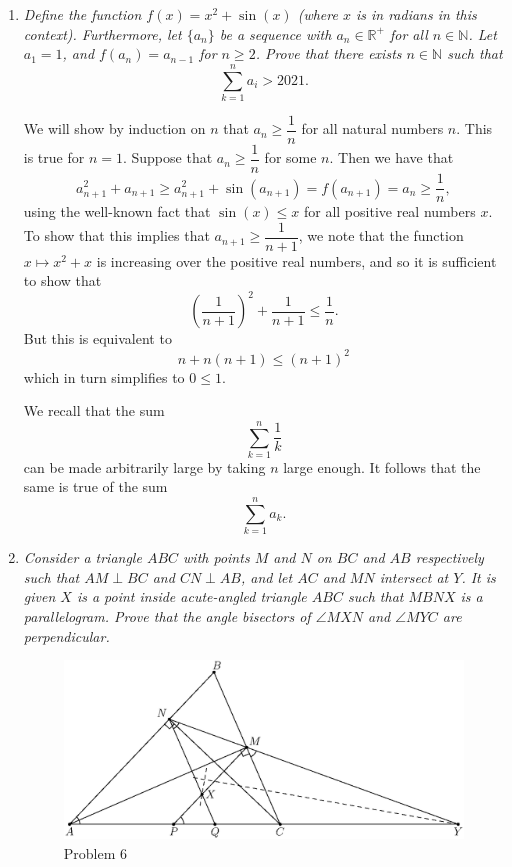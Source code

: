 \documentclass{article}
\begin{document}
\begin{enumerate}[1.]
\vspace{24pt}
\item %
{\itshape Define the function $f(x) = x^2 + \sin(x)$ (where $x$ is in radians in this context). Furthermore, let $\{a_n\}$ be a sequence with $a_n \in \mathbb{R}^+$ for all $n \in \mathbb{N}$. Let $a_1 = 1$, and $f(a_n) = a_{n - 1}$ for $n \ge 2$. Prove that there exists $n \in \mathbb{N}$ such that 
$$\sum_{k = 1}^n a_i > 2021.$$}

We will show by induction on $n$ that $a_n \geq \dfrac{1}{n}$ for all natural numbers $n$. This is true for $n = 1$. Suppose that $a_n \geq \dfrac{1}{n}$ for some $n$. Then we have that
\[
	a_{n + 1}^2 + a_{n + 1} \geq a_{n + 1}^2 + \sin(a_{n + 1}) = f(a_{n + 1}) = a_n \geq \dfrac{1}{n},
\]
using the well-known fact that $\sin(x) \leq x$ for all positive real numbers $x$. To show that this implies that $a_{n + 1} \geq \dfrac{1}{n + 1}$, we note that the function $x \mapsto x^2 + x$ is increasing over the positive real numbers, and so it is sufficient to show that
\[
	\left(\frac{1}{n + 1}\right)^2 + \frac{1}{n + 1} \leq \dfrac{1}{n}.
\]
But this is equivalent to
\[
	n + n(n + 1) \leq (n + 1)^2
\]
which in turn simplifies to $0 \leq 1$.

We recall that the sum
\[
	\sum_{k=1}^{n} \frac{1}{k}
\]
can be made arbitrarily large by taking $n$ large enough. It follows that the same is true of the sum
\[
	\sum_{k=1}^{n} a_k.	
\]


\vspace{24pt}
\item %
{\itshape Consider a triangle $ABC$ with points $M$ and $N$ on $BC$ and $AB$ respectively such that $AM \perp BC$ and $CN \perp AB$, and let $AC$ and $MN$ intersect at $Y$.
It is given $X$ is a point inside acute-angled triangle $ABC$ such that $MBNX$ is a parallelogram.
Prove that the angle bisectors of $\angle MXN$ and $\angle MYC$ are perpendicular.}

\begin{figure}[!ht]
	\centering
	\includegraphics{advanced_february_problem6.eps}
	\caption{Problem 6}\label{fig:q6part1}
\end{figure}


\end{enumerate}
\end{document}
